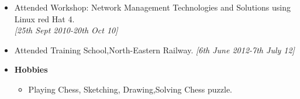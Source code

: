 \begin{itemize}
		\item Attended Workshop: Network Management Technologies and Solutions using Linux red Hat 4.\\ \emph{[25th Sept 2010-20th Oct 10]}\\ [-0.6cm] 
		\item Attended Training School,North-Eastern Railway. \hfill \emph{[6th June 2012-7th July 12]}\\[-0.6cm] 
		\item {\bf Hobbies}\\ [-0.6cm]
		\begin{itemize}
		 \item Playing Chess, Sketching, Drawing,Solving Chess puzzle.
		\end{itemize}
\end{itemize}
